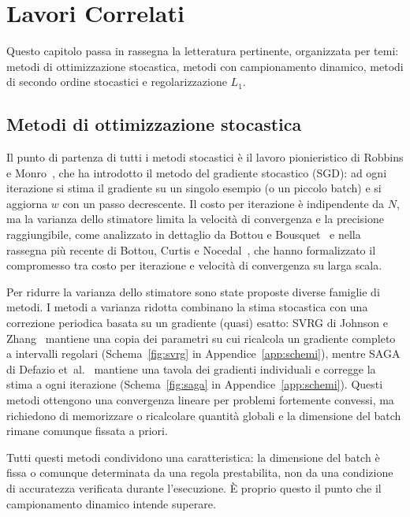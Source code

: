 \documentclass[a4paper,12pt]{article}
\numberwithin{equation}{section}
\numberwithin{figure}{section}
\numberwithin{table}{section}
\begin{document}
\section{Lavori Correlati}\label{sec:lavori}

Questo capitolo passa in rassegna la letteratura pertinente, organizzata per
temi: metodi di ottimizzazione stocastica, metodi con campionamento dinamico,
metodi di secondo ordine stocastici e regolarizzazione $L_1$.

\subsection{Metodi di ottimizzazione stocastica}

Il punto di partenza di tutti i metodi stocastici è il lavoro pionieristico di
Robbins e Monro~\cite{robbins1951}, che ha introdotto il metodo del gradiente
stocastico (SGD): ad ogni iterazione si stima il gradiente su un singolo
esempio (o un piccolo batch) e si aggiorna $w$ con un passo decrescente.
Il costo per iterazione è indipendente da $N$, ma la varianza dello stimatore
limita la velocità di convergenza e la precisione raggiungibile, come analizzato
in dettaglio da Bottou e Bousquet~\cite{bottou2008} e nella rassegna
più recente di Bottou, Curtis e Nocedal~\cite{bottou2018}, che hanno formalizzato il
compromesso tra costo per iterazione e velocità di convergenza su larga scala.

Per ridurre la varianza dello stimatore sono state proposte diverse famiglie di
metodi. I metodi a varianza ridotta combinano la stima stocastica con
una correzione periodica basata su un gradiente (quasi) esatto: SVRG di Johnson
e Zhang~\cite{johnson2013} mantiene una copia dei parametri su cui ricalcola un
gradiente completo a intervalli regolari (Schema~\ref{fig:svrg} in
Appendice~\ref{app:schemi}), mentre SAGA di Defazio
et~al.~\cite{defazio2014} mantiene una tavola dei gradienti individuali e
corregge la stima a ogni iterazione (Schema~\ref{fig:saga} in
Appendice~\ref{app:schemi}). Questi metodi ottengono una convergenza
lineare per problemi fortemente convessi, ma richiedono di memorizzare o
ricalcolare quantità globali e la dimensione del batch rimane comunque fissata
a priori.

Tutti questi metodi condividono una caratteristica: la dimensione del batch è
fissa o comunque determinata da una regola prestabilita, non da una
condizione di accuratezza verificata durante l'esecuzione. È proprio questo il
punto che il campionamento dinamico intende superare.
\end{document}
